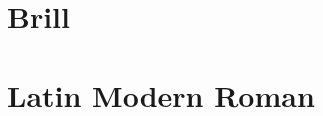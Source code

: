\documentclass[12pt,a4paper,openany]{memoir}
\newcommand{\afont}{}
\newcommand{\doit}[1]{%
	\renewcommand{\afont}{#1}	
	\chapter{#1}
	
	}
\begin{document}
\doit{Brill}
\doit{Latin Modern Roman}
\clearforchapter
\tableofcontents*
\end{document}
